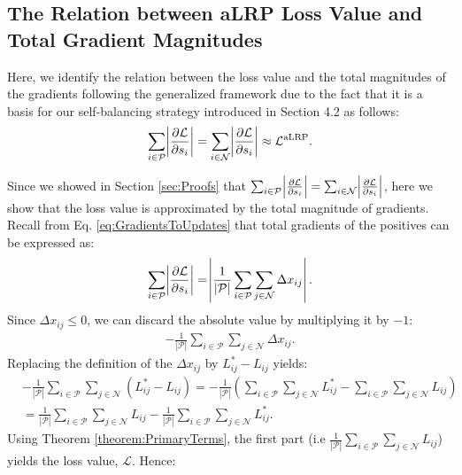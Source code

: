 \documentclass{article}
\begin{document}
\subsection{The Relation between aLRP Loss Value and Total Gradient Magnitudes}
\label{subsec:SB}
Here, we identify the relation between the loss value and the total magnitudes of the gradients following the generalized framework due to the fact that it is a basis for our self-balancing strategy introduced in Section 4.2 as follows:
\begin{align}
    \sum_{i \in \mathcal{P}} \abs{\frac{\partial \mathcal{L}}{\partial s_i}} = \sum_{i \in \mathcal{N}} \abs{\frac{\partial \mathcal{L}}{\partial s_i}} \approx \mathcal{L}^{\mathrm{aLRP}}.
\end{align}

Since we showed in Section \ref{sec:Proofs} that $\sum_{i \in \mathcal{P}} \abs{\frac{\partial \mathcal{L}}{\partial s_i}} = \sum_{i \in \mathcal{N}} \abs{\frac{\partial \mathcal{L}}{\partial s_i}}$, here we show that the loss value is approximated by the total magnitude of gradients. Recall from Eq. \eqref{eq:GradientsToUpdates} that total gradients of the positives can be expressed as:
\begin{align}
    \sum_{i \in \mathcal{P}} \abs{\frac{\partial \mathcal{L}}{\partial s_i}} =
    \abs{\frac{1}{|\mathcal{P}|} \sum \limits_{i \in \mathcal{P}} \sum \limits_{j \in \mathcal{N}} \Delta x_{ij}}.
\end{align}
Since $\Delta x_{ij} \leq 0$, we can discard the absolute value by multiplying it by $-1$:
\begin{align}
     - \frac{1}{|\mathcal{P}|} \sum \limits_{i \in \mathcal{P}} \sum \limits_{j \in \mathcal{N}} \Delta x_{ij}.
\end{align}
Replacing the definition of the $\Delta x_{ij}$ by $L_{ij}^*-L_{ij}$ yields:
\begin{align}
     &- \frac{1}{|\mathcal{P}|} \sum \limits_{i \in \mathcal{P}} \sum \limits_{j \in \mathcal{N}} (L_{ij}^*-L_{ij})
     = - \frac{1}{|\mathcal{P}|} \left( \sum \limits_{i \in \mathcal{P}} \sum \limits_{j \in \mathcal{N}} L_{ij}^* - \sum \limits_{i \in \mathcal{P}} \sum \limits_{j \in \mathcal{N}} L_{ij} \right) \\
     &= \frac{1}{|\mathcal{P}|}\sum \limits_{i \in \mathcal{P}} \sum \limits_{j \in \mathcal{N}} L_{ij} - \frac{1}{|\mathcal{P}|} \sum \limits_{i \in \mathcal{P}} \sum \limits_{j \in \mathcal{N}} L_{ij}^* .
\end{align}
Using Theorem \ref{theorem:PrimaryTerms}, the first part (i.e $\frac{1}{|\mathcal{P}|} \sum \limits_{i \in \mathcal{P}} \sum \limits_{j \in \mathcal{N}} L_{ij}$) yields the loss value, $\mathcal{L}$.  Hence:
\end{document}
